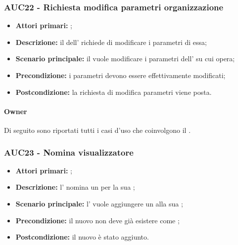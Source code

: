 \documentclass[casi-duso]{subfiles}
\begin{document}
\subsubsection{AUC22 - Richiesta modifica parametri organizzazione}
\label{subsub:AUC22}
\begin{itemize}
  \item \textbf{Attori primari:} ;
  \item \textbf{Descrizione:} il  dell' richiede di modificare i parametri di essa;
  \item \textbf{Scenario principale:} il  vuole modificare i parametri dell' su cui opera;
  \item \textbf{Precondizione:} i parametri devono essere effettivamente modificati;
  \item \textbf{Postcondizione:} la richiesta di modifica parametri viene posta.
\end{itemize}

\paragraph{Owner}
Di seguito sono riportati tutti i casi d'uso che coinvolgono il  .

\subsubsection{AUC23 - Nomina visualizzatore}
\label{subsub:AUC23}
\begin{itemize}
  \item \textbf{Attori primari:} ;
  \item \textbf{Descrizione:} l'  nomina un  per la sua ;
  \item \textbf{Scenario principale:} l'  vuole aggiungere un  alla sua ;
  \item \textbf{Precondizione:} il nuovo  non deve già esistere come ;
  \item \textbf{Postcondizione:} il nuovo  è stato aggiunto.
\end{itemize}
\end{document}
